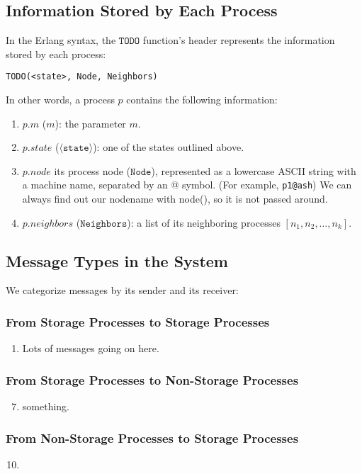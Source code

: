 \documentclass[11pt]{article}
\begin{document}
\subsection{Information Stored by Each Process}
In the Erlang syntax, the $\texttt{TODO}$ function's header represents
the information stored by each process:
\begin{lstlisting}
TODO(<state>, Node, Neighbors)
\end{lstlisting}
In other words, a process $p$ contains the following information:
\begin{enumerate}
\item $p.m$ ($m$): the parameter $m$.
\item $p.state$ ($\langle\texttt{state}\rangle$): one of the \numStates states outlined above.
\item $p.node$ its process node ($\texttt{Node}$), represented as a lowercase ASCII string with a machine name, separated by an @ symbol. (For example, \texttt{p1@ash}) We can always find out our nodename with node(), so it is not passed around.
\item $p.neighbors$ ($\texttt{Neighbors}$): a list of its neighboring processes $[n_1, n_2, \ldots, n_k]$.
\end{enumerate}

\subsection{Message Types in the System}
We categorize messages by its sender and its receiver:
\subsubsection{From Storage Processes to Storage Processes}
\begin{enumerate}[M1]
\item \label{M:fork} Lots of messages going on here.
\end{enumerate}

\subsubsection{From Storage Processes to Non-Storage Processes}
\begin{enumerate}[M1]
\setcounter{enumi}{6}
\item \label{M:become_white} something.
\end{enumerate}

\subsubsection{From Non-Storage Processes to Storage Processes}
\begin{enumerate}[M1]
\setcounter{enumi}{9}
\item 
\end{enumerate}
\end{document}
